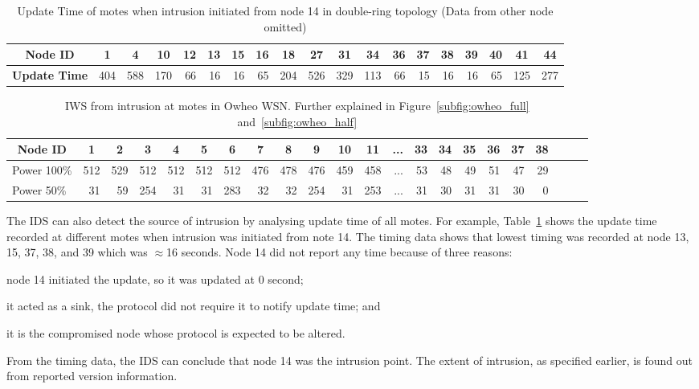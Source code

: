 \documentclass{CRPITStyle}
\newcommand*{\bd}[1]{\multicolumn{1}{|c|}{\bfseries #1}}
\begin{document}
\begin{table}[t]
\centering
\begin{tabular}{|l|*{17}{r|}r|}
\hline
\bd{Node ID}           & \bd{1} & \bd{4} & \bd{10} & \bd{12} & \bd{13} & \bd{15} & \bd{16} & \bd{18} & \bd{27} & \bd{31} & \bd{34} & \bd{36} & \bd{37} & \bd{38} & \bd{39} & \bd{40} & \bd{41} & \bd{44}\\
\hline
\bd{Update Time}  &   404 	&  588 	& 170 	& 66 	& 16 &	 16 	& 65 &	 204 &	 526 & 329 &	 113 &	 66 &	 15 	& 16 	& 16 &	 65 &	125 & 277 \\
\hline
\end{tabular}
\caption{Update Time of motes when intrusion initiated from node 14 in double-ring topology (Data from other node omitted) }
\label{tab:dr_time_14}
\end{table}

\begin{table}[t!]
\centering
\begin{tabular}{|l|*{20}{r|}r|}
\hline
\bd{Node ID}           & \bd{1} & \bd{2} & \bd{3} & \bd{4} & \bd{5} & \bd{6} & \bd{7} & \bd{8} & \bd{9} & \bd{10} & \bd{11} & \bd{...} & \bd{33} & \bd{34} & \bd{35} & \bd{36} & \bd{37} & \bd{38} \\
\hline		\hline

Power 100\%	   & 512 & 529 & 512 & 512 & 512  & 512 & 476 & 478 & 476 & 459 & 458 & ...& 53  & 48 & 49 & 51 & 47 & 29 \\
\hline

Power 50\%	  &31 & 59&254& 31& 31 &283& 32& 32& 254& 31 &253 & ... & 31  & 30 & 31 & 31 & 30 & 0 \\
\hline
\end{tabular}
\caption{IWS from intrusion at motes in Owheo WSN. Further explained in Figure~\ref{subfig:owheo_full} and~\ref{subfig:owheo_half} }
\label{tab:owheo}
\end{table}


The IDS can also detect the source of intrusion by analysing update time of all motes. %
For example, Table~\ref{tab:dr_time_14} shows the update time recorded at different motes when intrusion was initiated from note 14.
The timing data shows that lowest timing was recorded at node 13, 15, 37, 38, and 39 which was $\approx$16 seconds.
Node 14 did not report any time because of three reasons: 
\begin{inparaenum}
\item node 14 initiated the update, so it was updated at $0$ second;
\item it acted as a sink, the protocol did not require it to notify update time; and 
\item it is the compromised node whose protocol is expected to be altered.
\end{inparaenum}
From the timing data, the IDS can conclude that node 14 was the intrusion point.
The extent of intrusion, as specified earlier, is found out from reported version information.
\end{document}
